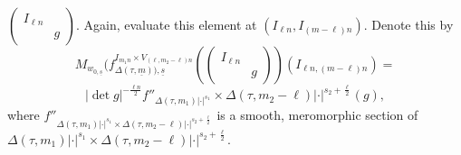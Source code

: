\documentclass[12pts]{amsart}
\begin{document}
     	$\begin{pmatrix}I_{\ell n}\\&g\end{pmatrix}$. Again, evaluate this element at $(I_{\ell n}, I_{(m-\ell)n})$. Denote this by
     	\begin{equation}\label{2.2}
     	M_{w_{0,\underline{s}}}(f^{I_{m_1n}\times V_{(\ell,m_2-\ell)n}}_{\Delta(\tau,\underline{m})),\underline{s}}(\begin{pmatrix}I_{\ell n}\\&g\end{pmatrix})(I_{\ell n,(m-\ell)n})
     	=
     	\end{equation}
     	$$
     	|\det g|^{-\frac{\ell n}{2}}f''_{\Delta(\tau,m_1)|\cdot|^{s_1}}\times \Delta(\tau,m_2-\ell)|\cdot|^{s_2+\frac{\ell}{2}}(g),  
     	$$
     	where $f''_{\Delta(\tau,m_1)|\cdot|^{s_1}\times \Delta(\tau,m_2-\ell)|\cdot|^{s_2+\frac{\ell}{2}}}$	is a smooth,
     		 meromorphic section of $\Delta(\tau,m_1)|\cdot|^{s_1}\times \Delta(\tau,m_2-\ell)|\cdot|^{s_2+\frac{\ell}{2}}$. 
     
\end{document}
